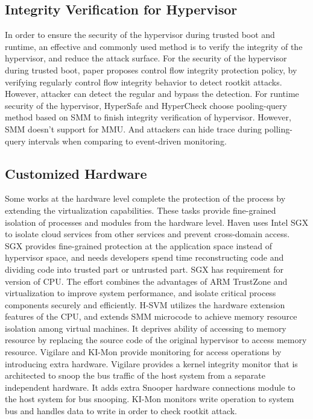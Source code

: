 \documentclass[conference]{IEEEtran}
\begin{document}
\subsection{Integrity Verification for Hypervisor}
In order to ensure the security of the hypervisor during trusted boot and runtime, an effective and commonly used method is to verify the integrity of the hypervisor, and reduce the attack surface. For the security of the hypervisor during trusted boot, paper \cite{Petroni2007Automated} proposes control flow integrity protection policy, by verifying regularly control flow integrity behavior to detect rootkit attacks. However, attacker can detect the regular and bypass the detection. For runtime security of the hypervisor, HyperSafe \cite{Wang2010HyperSafe} and HyperCheck \cite{Wang2010HyperCheck} choose pooling-query method based on SMM to finish integrity verification of hypervisor. However, SMM doesn't support for MMU. And attackers can hide trace during polling-query intervals when comparing to event-driven monitoring.
\subsection{Customized Hardware }
Some works at the hardware level complete the protection of the process by extending the virtualization capabilities. These tasks provide fine-grained isolation of processes and modules from the hardware level. Haven \cite{haven} uses Intel SGX\cite{Hoekstra13cuvillo,Mckeen2013Innovative} to isolate cloud services from other services and prevent cross-domain access. SGX provides fine-grained protection at the application space instead of hypervisor space, and needs developers spend time reconstructing code and dividing code into trusted part or untrusted part. SGX has requirement for version of CPU. The effort \cite{Cho2016Hardware} combines the advantages of ARM TrustZone and virtualization to improve system performance, and isolate critical process components securely and efficiently. H-SVM\cite{Jin2015H} utilizes the hardware extension features of the CPU, and extends SMM microcode to achieve memory resource isolation among virtual machines. It deprives ability of accessing to memory resource by replacing the source code of the original hypervisor to access memory resource. Vigilare\cite{Moon2012Vigilare} and KI-Mon \cite{Lee2013KI} provide monitoring for access operations by introducing extra hardware. Vigilare provides a kernel integrity monitor that is architected to snoop the bus traffic of the host system from a separate independent hardware. It adds extra Snooper hardware connections module to the host system for bus snooping. KI-Mon monitors write operation to system bus and handles data to write in order to check rootkit attack.
\end{document}
